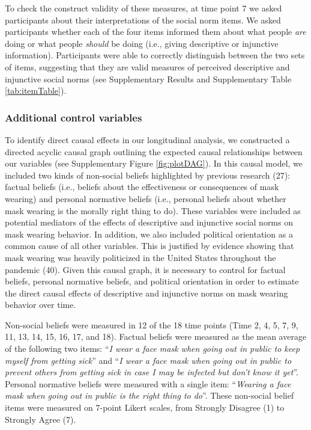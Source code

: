 \documentclass[
  man,floatsintext]{apa6}
\begin{document}
To check the construct validity of these measures, at time point 7 we asked participants about their interpretations of the social norm items. We asked participants whether each of the four items informed them about what people \emph{are} doing or what people \emph{should} be doing (i.e., giving descriptive or injunctive information). Participants were able to correctly distinguish between the two sets of items, suggesting that they are valid measures of perceived descriptive and injunctive social norms (see Supplementary Results and Supplementary Table \ref{tab:itemTable}).

\hypertarget{additional-control-variables}{%
\subsubsection{Additional control variables}\label{additional-control-variables}}

To identify direct causal effects in our longitudinal analysis, we constructed a directed acyclic causal graph outlining the expected causal relationships between our variables (see Supplementary Figure \ref{fig:plotDAG}). In this causal model, we included two kinds of non-social beliefs highlighted by previous research (27): factual beliefs (i.e., beliefs about the effectiveness or consequences of mask wearing) and personal normative beliefs (i.e., personal beliefs about whether mask wearing is the morally right thing to do). These variables were included as potential mediators of the effects of descriptive and injunctive social norms on mask wearing behavior. In addition, we also included political orientation as a common cause of all other variables. This is justified by evidence showing that mask wearing was heavily politicized in the United States throughout the pandemic (40). Given this causal graph, it is necessary to control for factual beliefs, personal normative beliefs, and political orientation in order to estimate the direct causal effects of descriptive and injunctive norms on mask wearing behavior over time.

Non-social beliefs were measured in 12 of the 18 time points (Time 2, 4, 5, 7, 9, 11, 13, 14, 15, 16, 17, and 18). Factual beliefs were measured as the mean average of the following two items: ``\emph{I wear a face mask when going out in public to keep myself from getting sick}'' and ``\emph{I wear a face mask when going out in public to prevent others from getting sick in case I may be infected but don't know it yet}''. Personal normative beliefs were measured with a single item: ``\emph{Wearing a face mask when going out in public is the right thing to do}''. These non-social belief items were measured on 7-point Likert scales, from Strongly Disagree (1) to Strongly Agree (7).
\end{document}
